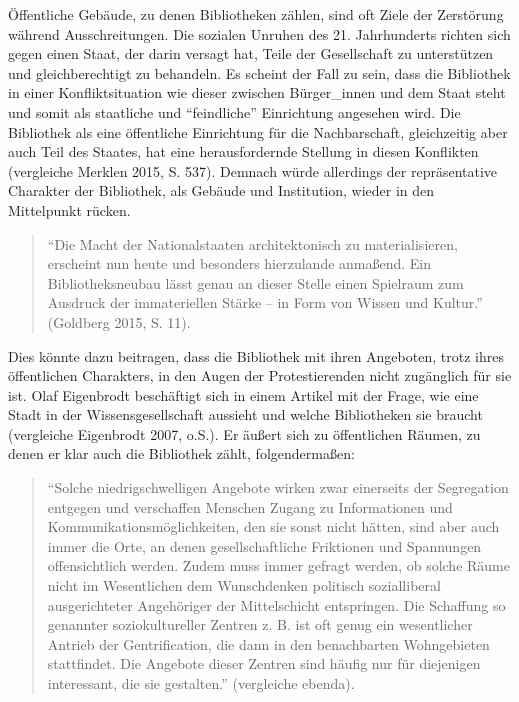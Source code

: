 \documentclass[a4paper,
fontsize=11pt,
oneside,
numbers=noperiodatend,
parskip=half-,
bibliography=totoc,
final
]{scrartcl}
\begin{document}
Öffentliche Gebäude, zu denen Bibliotheken zählen, sind oft Ziele der
Zerstörung während Ausschreitungen. Die sozialen Unruhen des 21.
Jahrhunderts richten sich gegen einen Staat, der darin versagt hat,
Teile der Gesellschaft zu unterstützen und gleichberechtigt zu
behandeln. Es scheint der Fall zu sein, dass die Bibliothek in einer
Konfliktsituation wie dieser zwischen Bürger\_innen und dem Staat steht
und somit als staatliche und \enquote{feindliche} Einrichtung angesehen
wird. Die Bibliothek als eine öffentliche Einrichtung für die
Nachbarschaft, gleichzeitig aber auch Teil des Staates, hat eine
herausfordernde Stellung in diesen Konflikten (vergleiche Merklen 2015,
S. 537). Demnach würde allerdings der repräsentative Charakter der
Bibliothek, als Gebäude und Institution, wieder in den Mittelpunkt
rücken.

\begin{quote}
\enquote{Die Macht der Nationalstaaten architektonisch zu
materialisieren, erscheint nun heute und besonders hierzulande anmaßend.
Ein Bibliotheksneubau lässt genau an dieser Stelle einen Spielraum zum
Ausdruck der immateriellen Stärke -- in Form von Wissen und Kultur.}
(Goldberg 2015, S. 11).
\end{quote}

Dies könnte dazu beitragen, dass die Bibliothek mit ihren Angeboten,
trotz ihres öffentlichen Charakters, in den Augen der Protestierenden
nicht zugänglich für sie ist. Olaf Eigenbrodt beschäftigt sich in einem
Artikel mit der Frage, wie eine Stadt in der Wissensgesellschaft
aussieht und welche Bibliotheken sie braucht (vergleiche Eigenbrodt
2007, o.S.). Er äußert sich zu öffentlichen Räumen, zu denen er klar
auch die Bibliothek zählt, folgendermaßen:

\begin{quote}
\enquote{Solche niedrigschwelligen Angebote wirken zwar einerseits der
Segregation entgegen und verschaffen Menschen Zugang zu Informationen
und Kommunikationsmöglichkeiten, den sie sonst nicht hätten, sind aber
auch immer die Orte, an denen gesellschaftliche Friktionen und
Spannungen offensichtlich werden. Zudem muss immer gefragt werden, ob
solche Räume nicht im Wesentlichen dem Wunschdenken politisch
sozialliberal ausgerichteter Angehöriger der Mittelschicht entspringen.
Die Schaffung so genannter soziokultureller Zentren z. B. ist oft genug
ein wesentlicher Antrieb der Gentrification, die dann in den
benachbarten Wohngebieten stattfindet. Die Angebote dieser Zentren sind
häufig nur für diejenigen interessant, die sie gestalten.} (vergleiche
ebenda).
\end{quote}
\end{document}

